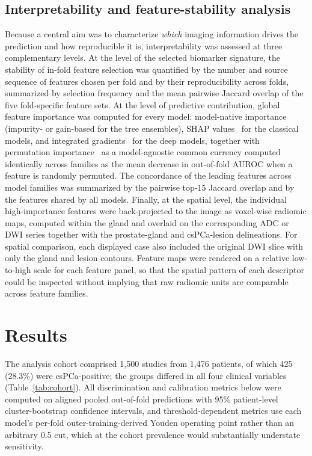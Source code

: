 \documentclass[11pt]{article}
\begin{document}
\subsection{Interpretability and feature-stability analysis}
\label{sec:interpret-methods}

Because a central aim was to characterize \emph{which} imaging information drives
the prediction and how reproducible it is, interpretability was assessed at three
complementary levels. At the level of the selected biomarker signature, the
stability of in-fold feature selection was quantified by the number and source
sequence of features chosen per fold and by their reproducibility across folds,
summarized by selection frequency and the mean pairwise Jaccard overlap of the
five fold-specific feature sets. At the level of predictive contribution, global
feature importance was computed for every model: model-native importance
(impurity- or gain-based for the tree ensembles), SHAP
values~\citep{lundberg2017unified} for the classical models, and integrated
gradients~\citep{sundararajan2017axiomatic} for the deep models, together with
permutation importance~\citep{fisher2019all} as a model-agnostic common currency
computed identically across families as the mean decrease in out-of-fold AUROC
when a feature is randomly permuted. The concordance of the leading features
across model families was summarized by the pairwise top-15 Jaccard overlap and
by the features shared by all models. Finally, at the spatial level, the
individual high-importance features were back-projected to the image as
voxel-wise radiomic maps, computed within the gland and overlaid on the
corresponding ADC or DWI series together with the prostate-gland and
csPCa-lesion delineations. For spatial comparison, each displayed case also
included the original DWI slice with only the gland and lesion contours. Feature
maps were rendered on a relative low-to-high scale for each feature panel, so
that the spatial pattern of each descriptor could be inspected without implying
that raw radiomic units are comparable across feature families.

\section{Results}
\label{sec:results}

The analysis cohort comprised 1{,}500 studies from 1{,}476 patients, of which
425 (28.3\%) were csPCa-positive; the groups differed in all four clinical
variables (Table~\ref{tab:cohort}). All discrimination and calibration metrics
below were computed on aligned pooled out-of-fold predictions with 95\%
patient-level cluster-bootstrap confidence intervals, and threshold-dependent
metrics use each model's per-fold outer-training-derived Youden operating point
rather than an arbitrary 0.5 cut, which at the cohort prevalence would
substantially understate sensitivity.
\end{document}
